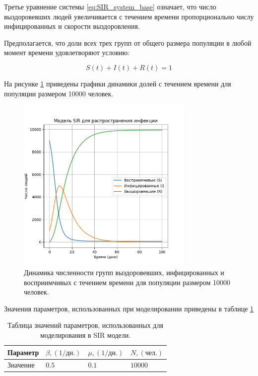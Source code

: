 \documentclass[14pt,a4paper]{article}
\begin{document}
Третье уравнение системы \eqref{eq:SIR_system_base} означает, что число выздоровевших людей увеличивается с течением времени пропорционально числу инфицированных и скорости выздоровления.

Предполагается, что доли всех трех групп от общего размера популяции в любой момент времени удовлетворяют условию:

\begin{equation}
	S(t) + I(t) + R(t) = 1
	\label{eq:norm}
\end{equation}

На рисунке \ref{fig:sir} приведены графики динамики долей с течением времени для популяции размером 10000 человек.

\begin{figure}[h!]
	\centering
	\includegraphics[width=0.76\textwidth]{img/sir_ex(2).png}
	\caption{Динамика численности групп выздоровевших, инфицированных и восприимчивых с течением времени для популяции размером 10000 человек.}
	
	\label{fig:sir}
\end{figure} 
 
Значения параметров, использованных при моделировании приведены в таблице 	\ref{tab:param_th_sir}
 
\begin{table}[h!]
	\centering
	\caption{Таблица значений параметров, использованных для  моделирования в SIR модели.}
	\begin{tabularx}{\textwidth}{|X|X|X|X|}
		\hline
		Параметр & $\beta, (1/\text{дн.})$  & $\mu, (1/\text{дн.})$ & $N, (\text{чел.})$  \\
		\hline
		Значение & $0.5$ & $0.1$ & $10000$  \\
		\hline
	\end{tabularx}
	
	\label{tab:param_th_sir}
\end{table} 
 
\end{document}

